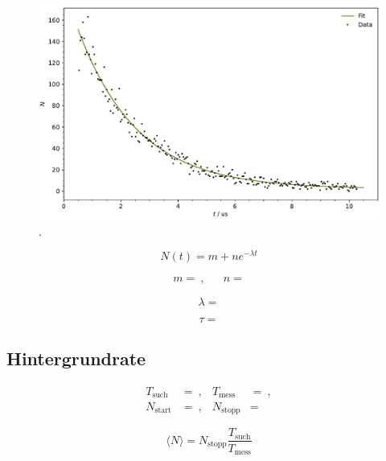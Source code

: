 \begin{figure}[H]
	\centering
	\includegraphics[width=\textwidth]{build/lifetime.pdf}
	\caption{.}
	\label{fig:lifetime}
\end{figure}

\begin{equation*}
	N(t) = m + ne^{-\lambda t}
\end{equation*}

\begin{align*}
	m =  \: , && n = 
\end{align*}

\begin{equation*}
	\lambda = 
\end{equation*}

\begin{equation*}
	\tau = 
\end{equation*}



\subsection{Hintergrundrate}

\begin{align*}
	T_\text{such} &=  \: , & T_\text{mess} &=  \: , \\
	N_\text{start} &=  \: , & N_\text{stopp} &= 
\end{align*}

\begin{equation*}
	\langle N \rangle = N_\text{stopp} \frac{T_\text{such}}{T_\text{mess}}
\end{equation*}

